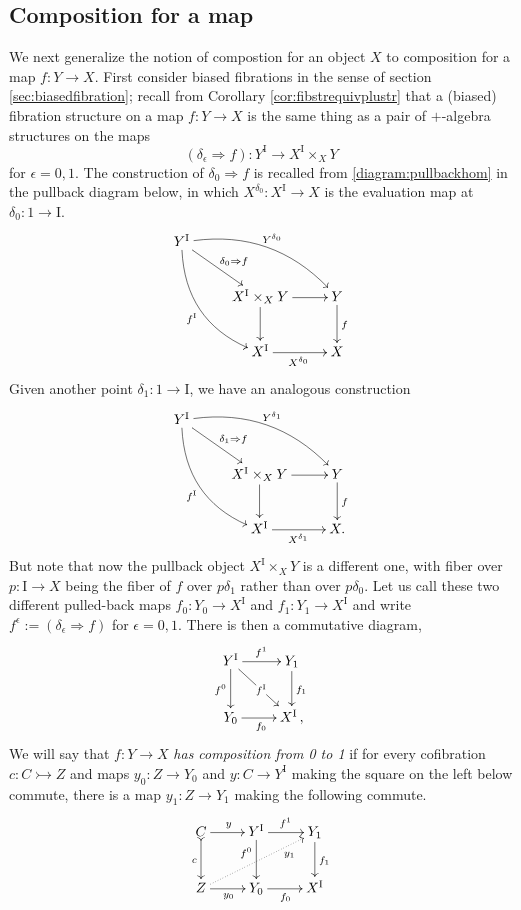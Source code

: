 \documentclass[11pt]{article}
\newcommand{\mono}{\ensuremath{\rightarrowtail}}
\newcommand{\ra}{\ensuremath{\rightarrow}}
\newcommand{\I}{\ensuremath{\mathrm{I}}}
\theoremstyle{remark}
\theoremstyle{definition}
\begin{document}
\subsection{Composition for a map}
We next generalize the notion of compostion for an object $X$ to composition for a map $f : Y\to X$.  First consider biased fibrations in the sense of section \ref{sec:biasedfibration}; recall from Corollary \ref{cor:fibstrequivplustr} that a (biased) fibration structure on a map $f :Y\ra X$ is the same thing as a pair of $+$-algebra structures on the maps
\[
(\delta_\epsilon\Rightarrow\!{f}) : Y^\I \to X^\I \times_{X} Y
\]
for $\epsilon = 0,1$.  The construction of $\delta_0\Rightarrow\!{f}$ is recalled from \eqref{diagram:pullbackhom} in the pullback diagram below, in which $X^{\delta_0}:X^\I \ra X$ is the evaluation map at $\delta_0 : 1\ra \I$.
\begin{equation}\label{diagram:pullbackhomreview}
\xymatrix{
Y^\I \ar@/_4ex/ [rdd]_{f^\I} \ar[rd]^{\delta_0\Rightarrow{f}} \ar@/^4ex/ [rrd]^{Y^{\delta_0}} && \\
& X^\I \times_{X} Y \ar[d] \ar[r] & Y \ar[d]^{f} \\
& X^\I \ar[r]_{X^{\delta_0}} &  X
}
\end{equation}
%
Given another point $\delta_1 : 1\ra \I$, we have an analogous construction
\begin{equation}\label{diagram:pullbackhomreviewprime}
\xymatrix{
Y^\I \ar@/_4ex/ [rdd]_{f^\I} \ar[rd]^{\delta_1\Rightarrow{f}} \ar@/^4ex/ [rrd]^{Y^{\delta_1}}  && \\
& X^\I \times_{X} Y \ar[d] \ar[r] & Y \ar[d]^{f} \\
& X^\I \ar[r]_{X^{\delta_1}} &  X.
}
\end{equation}
But note that now the pullback object $X^\I \times_{X} Y $ is a different one, with fiber over $p : \I \ra X$ being the fiber of $f$ over $p\delta_1$ rather than over $p\delta_0$.  Let us call these two different pulled-back maps $f_0:Y_0\ra X^\I$ and $f_1:Y_1 \ra X^\I$ and write $f^\epsilon := (\delta_\epsilon\Rightarrow{f})$ for $\epsilon = 0,1$.  There is then a commutative diagram,
%
\begin{equation}\label{diagram:composition1}
\xymatrix{
Y^\I \ar[d]_{f^0} \ar[rd]|{f^\I} \ar[r]^{f^1} & Y_1 \ar[d]^{f_1}\\
Y_0 \ar[r]_{f_0} & X^\I\,,
}
\end{equation}
%
We will say that $f:Y\ra X$ \emph{has composition from 0 to 1} if for every cofibration $c : C\mono Z$ and maps $y_0 : Z\ra Y_0$ and $y : C\ra Y^\I$ making the square on the left below commute, there is a map $y_1 : Z\ra Y_1$ making the following commute.
\begin{equation}\label{diagram:composition2}
\xymatrix{
C \ar@{>->}[d]_{c} \ar[r]^{y} & Y^\I \ar[d]_>>>>>>>{f^0} \ar[r]^{f^1} & Y_1 \ar[d]^{f_1}\\
Z \ar@{..>}[rru]_>>>>>>{y_1} \ar[r]_{y_0} & Y_0 \ar[r]_{f_0} & X^\I
}
\end{equation}
\end{document}

